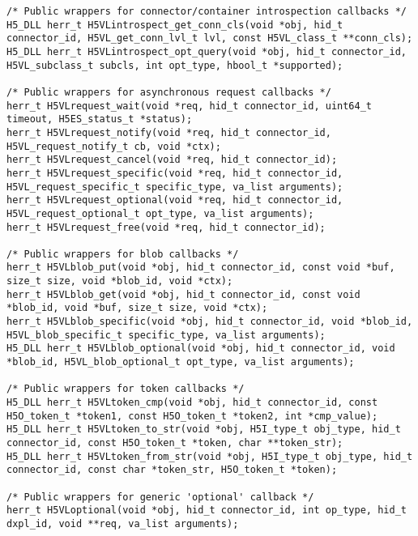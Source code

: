 \begin{appendices}
\begin{lstlisting}
/* Public wrappers for connector/container introspection callbacks */            
H5_DLL herr_t H5VLintrospect_get_conn_cls(void *obj, hid_t connector_id, H5VL_get_conn_lvl_t lvl, const H5VL_class_t **conn_cls);                     
H5_DLL herr_t H5VLintrospect_opt_query(void *obj, hid_t connector_id, H5VL_subclass_t subcls, int opt_type, hbool_t *supported);                   

/* Public wrappers for asynchronous request callbacks */                         
herr_t H5VLrequest_wait(void *req, hid_t connector_id, uint64_t timeout, H5ES_status_t *status);
herr_t H5VLrequest_notify(void *req, hid_t connector_id, H5VL_request_notify_t cb, void *ctx);
herr_t H5VLrequest_cancel(void *req, hid_t connector_id);                 
herr_t H5VLrequest_specific(void *req, hid_t connector_id, H5VL_request_specific_t specific_type, va_list arguments);
herr_t H5VLrequest_optional(void *req, hid_t connector_id, H5VL_request_optional_t opt_type, va_list arguments);
herr_t H5VLrequest_free(void *req, hid_t connector_id);                   
                                                                                 
/* Public wrappers for blob callbacks */                                         
herr_t H5VLblob_put(void *obj, hid_t connector_id, const void *buf, size_t size, void *blob_id, void *ctx);
herr_t H5VLblob_get(void *obj, hid_t connector_id, const void *blob_id, void *buf, size_t size, void *ctx);
herr_t H5VLblob_specific(void *obj, hid_t connector_id, void *blob_id, H5VL_blob_specific_t specific_type, va_list arguments);
H5_DLL herr_t H5VLblob_optional(void *obj, hid_t connector_id, void *blob_id, H5VL_blob_optional_t opt_type, va_list arguments);
                                                                                 
/* Public wrappers for token callbacks */                                        
H5_DLL herr_t H5VLtoken_cmp(void *obj, hid_t connector_id, const H5O_token_t *token1, const H5O_token_t *token2, int *cmp_value);
H5_DLL herr_t H5VLtoken_to_str(void *obj, H5I_type_t obj_type, hid_t connector_id, const H5O_token_t *token, char **token_str);
H5_DLL herr_t H5VLtoken_from_str(void *obj, H5I_type_t obj_type, hid_t connector_id, const char *token_str, H5O_token_t *token);

/* Public wrappers for generic 'optional' callback */                            
herr_t H5VLoptional(void *obj, hid_t connector_id, int op_type, hid_t dxpl_id, void **req, va_list arguments); 

\end{lstlisting}

\end{appendices}

